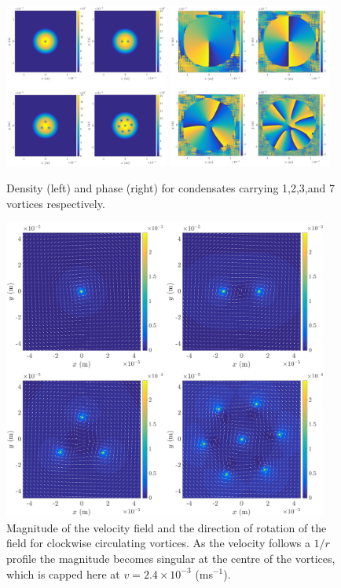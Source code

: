 \begin{figure}\centering
    \includegraphics[width=0.48\textwidth]{Images/ch4_vtx/fewvortex_rho.pdf}
    \includegraphics[width=0.48\textwidth]{Images/ch4_vtx/fewvortex_theta.pdf}
    \caption{Density (left) and phase (right) for condensates carrying 1,2,3,and 7 vortices respectively.}
    \label{fig:few_rho}
\end{figure}

\begin{figure}\centering
    \includegraphics[width=0.95\textwidth]{Images/ch4_vtx/velocity/velocity_fixedmag}
    \caption{Magnitude of the velocity field and the direction of rotation of the field for clockwise circulating vortices. As the velocity follows a $1/r$ profile the magnitude becomes singular at the centre of the vortices, which is capped here at $v=2.4\times 10^{-3}$ (ms$^{-1}$).}
    \label{fig:vel_field}
\end{figure}

